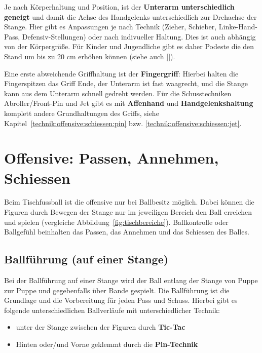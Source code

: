 Je nach Körperhaltung und Position, ist der \textbf{Unterarm unterschiedlich geneigt} und damit die Achse des Handgelenks unterschiedlich zur Drehachse der Stange.
Hier gibt es Anpassungen je nach Technik (Zieher, Schieber, Linke-Hand-Pass, Defensiv-Stellungen) oder nach indivueller Haltung.
Dies ist auch abhängig von der Körpergröße. 
Für Kinder und Jugendliche gibt es daher Podeste die den Stand um bis zu 20 cm erhöhen können (siehe auch \ref{}).


Eine erste abweichende Griffhaltung ist der \textbf{Fingergriff}: Hierbei halten die Fingerspitzen das Griff Ende, der Unterarm ist fast waagrecht, und die Stange kann aus dem Unterarm schnell gedreht werden.
Für die Schusstechniken Abroller/Front-Pin und Jet gibt es mit \textbf{Affenhand} und \textbf{Handgelenkshaltung} komplett andere Grundhaltungen des Griffs, siehe Kapitel~\ref{technik:offensive:schiessen:pin} bzw. \ref{technik:offensive:schiessen:jet}.


\section{Offensive: Passen, Annehmen, Schiessen}
\label{technik:offensive}

Beim Tischfussball ist die \gls{offensive} nur bei Ballbesitz möglich.
Dabei können die Figuren durch Bewegen der Stange nur im jeweiligen Bereich den Ball erreichen und spielen (vergleiche Abbildung~\ref{fig:tischbereiche}).
Ballkontrolle oder Ballgefühl beinhalten das Passen, das Annehmen und das Schiessen des Balles.

\subsection{Ballführung (auf einer Stange)} 
\label{technik:offensive:eine}

Bei der Ballführung auf einer Stange wird der Ball entlang der Stange von Puppe zur Puppe und gegebenfalls über Bande gespielt. 
Die Ballführung ist die Grundlage und die Vorbereitung für jeden Pass und Schuss.
Hierbei gibt es folgende unterschiedlichen Ballverläufe mit unterschiedlicher Technik:
\begin{itemize}
    \item unter der Stange zwischen der Figuren durch \textbf{Tic-Tac}
    \item Hinten oder/und Vorne geklemmt durch die \textbf{Pin-Technik}
\end{itemize}

